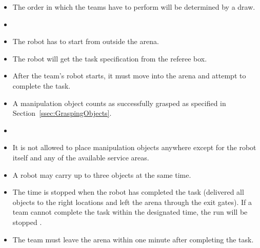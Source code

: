 \begin{itemize}
\item The order in which the teams have to perform will be determined by a draw.
\item {}
\item The robot has to start from outside the arena.
\item The robot will get the task specification from the referee box.
\item After the team's robot starts, it must move into the arena and attempt to complete the task. 
\item A manipulation object counts as successfully grasped as specified in Section~\ref{ssec:GraspingObjects}.
\item {}
\item It is not allowed to place manipulation objects anywhere except for the robot itself and any of the available service areas.
\item A robot may carry up to three objects at the same time.
\item The time is stopped when the robot has completed the task (delivered all objects to the right locations and left the arena through the exit gates). If a team cannot complete the task within  the designated time, the run will be stopped . 
\item The team must leave the arena within one minute after completing the task.
\end{itemize}


%
%
%
